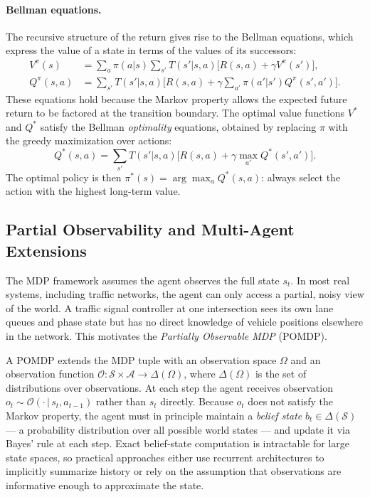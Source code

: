 \paragraph{Bellman equations.}
The recursive structure of the return gives rise to the Bellman equations, which express the value of a state in terms of the values of its successors:
\begin{align}
  V^{\pi}(s)   & = \sum_a \pi(a|s) \sum_{s'} T(s'|s,a)\bigl[R(s,a) + \gamma V^{\pi}(s')\bigr], \label{eq:bellman_v}         \\
  Q^{\pi}(s,a) & = \sum_{s'} T(s'|s,a)\bigl[R(s,a) + \gamma \sum_{a'} \pi(a'|s') Q^{\pi}(s',a')\bigr]. \label{eq:bellman_q}
\end{align}
These equations hold because the Markov property allows the expected future return to be factored at the transition boundary. The optimal value functions $V^*$ and $Q^*$ satisfy the Bellman \emph{optimality} equations, obtained by replacing $\pi$ with the greedy maximization over actions:
\begin{equation}
  Q^*(s,a) = \sum_{s'} T(s'|s,a)\bigl[R(s,a) + \gamma \max_{a'} Q^*(s',a')\bigr].
  \label{eq:bellman_opt}
\end{equation}
The optimal policy is then $\pi^*(s) = \arg\max_a Q^*(s,a)$: always select the action with the highest long-term value.

\subsection{Partial Observability and Multi-Agent Extensions}
\label{sec:TheoreticalBackground_POMDP}

The MDP framework assumes the agent observes the full state $s_t$. In most real systems, including traffic networks, the agent can only access a partial, noisy view of the world. A traffic signal controller at one intersection sees its own lane queues and phase state but has no direct knowledge of vehicle positions elsewhere in the network. This motivates the \emph{Partially Observable MDP} (POMDP).

A POMDP extends the MDP tuple with an observation space $\Omega$ and an observation function $\mathcal{O}: \mathcal{S} \times \mathcal{A} \rightarrow \Delta(\Omega)$, where $\Delta(\Omega)$ is the set of distributions over observations. At each step the agent receives observation $o_t \sim \mathcal{O}(\cdot\,|\,s_t, a_{t-1})$ rather than $s_t$ directly. Because $o_t$ does not satisfy the Markov property, the agent must in principle maintain a \emph{belief state} $b_t \in \Delta(\mathcal{S})$ — a probability distribution over all possible world states — and update it via Bayes' rule at each step. Exact belief-state computation is intractable for large state spaces, so practical approaches either use recurrent architectures to implicitly summarize history or rely on the assumption that observations are informative enough to approximate the state.

